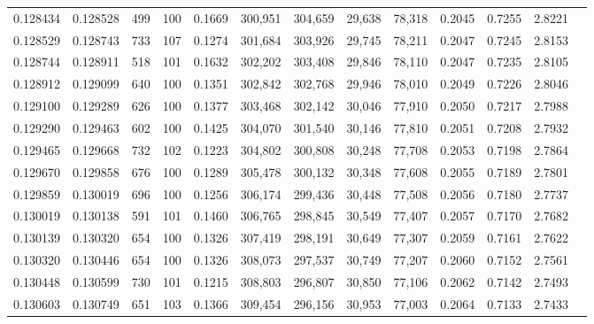 \begin{tabular}{rrrrrrrrrrrrr}
0.128434 & 0.128528 &   499 & 100 &                                     0.1669 & 300,951 & 304,659 &  29,638 &  78,318 & 0.2045 & 0.7255 & 2.8221 \\
0.128529 & 0.128743 &   733 & 107 &                                     0.1274 & 301,684 & 303,926 &  29,745 &  78,211 & 0.2047 & 0.7245 & 2.8153 \\
0.128744 & 0.128911 &   518 & 101 &                                     0.1632 & 302,202 & 303,408 &  29,846 &  78,110 & 0.2047 & 0.7235 & 2.8105 \\
0.128912 & 0.129099 &   640 & 100 &                                     0.1351 & 302,842 & 302,768 &  29,946 &  78,010 & 0.2049 & 0.7226 & 2.8046 \\
0.129100 & 0.129289 &   626 & 100 &                                     0.1377 & 303,468 & 302,142 &  30,046 &  77,910 & 0.2050 & 0.7217 & 2.7988 \\
0.129290 & 0.129463 &   602 & 100 &                                     0.1425 & 304,070 & 301,540 &  30,146 &  77,810 & 0.2051 & 0.7208 & 2.7932 \\
0.129465 & 0.129668 &   732 & 102 &                                     0.1223 & 304,802 & 300,808 &  30,248 &  77,708 & 0.2053 & 0.7198 & 2.7864 \\
0.129670 & 0.129858 &   676 & 100 &                                     0.1289 & 305,478 & 300,132 &  30,348 &  77,608 & 0.2055 & 0.7189 & 2.7801 \\
0.129859 & 0.130019 &   696 & 100 &                                     0.1256 & 306,174 & 299,436 &  30,448 &  77,508 & 0.2056 & 0.7180 & 2.7737 \\
0.130019 & 0.130138 &   591 & 101 &                                     0.1460 & 306,765 & 298,845 &  30,549 &  77,407 & 0.2057 & 0.7170 & 2.7682 \\
0.130139 & 0.130320 &   654 & 100 &                                     0.1326 & 307,419 & 298,191 &  30,649 &  77,307 & 0.2059 & 0.7161 & 2.7622 \\
0.130320 & 0.130446 &   654 & 100 &                                     0.1326 & 308,073 & 297,537 &  30,749 &  77,207 & 0.2060 & 0.7152 & 2.7561 \\
0.130448 & 0.130599 &   730 & 101 &                                     0.1215 & 308,803 & 296,807 &  30,850 &  77,106 & 0.2062 & 0.7142 & 2.7493 \\
0.130603 & 0.130749 &   651 & 103 &                                     0.1366 & 309,454 & 296,156 &  30,953 &  77,003 & 0.2064 & 0.7133 & 2.7433 \\

\end{tabular}
